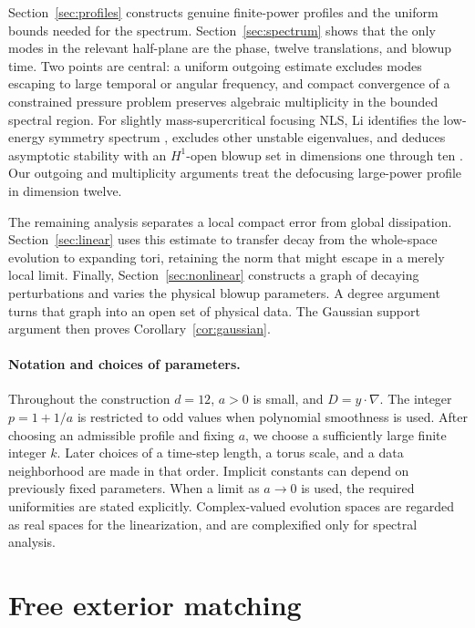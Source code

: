 \documentclass[11pt]{article}
\numberwithin{equation}{section}
\theoremstyle{definition}
\theoremstyle{remark}
\begin{document}
Section~\ref{sec:profiles} constructs genuine finite-power profiles and
the uniform bounds needed for the spectrum. Section~\ref{sec:spectrum}
shows that the only modes in the relevant half-plane are the phase,
twelve translations, and blowup time. Two points are central: a uniform
outgoing estimate excludes modes escaping to large temporal or angular
frequency, and compact convergence of a constrained pressure problem
preserves algebraic multiplicity in the bounded spectral region.
For slightly mass-supercritical focusing NLS, Li identifies the
low-energy symmetry spectrum \cite[Theorem~1.1]{Li2025Low}, excludes
other unstable eigenvalues, and deduces asymptotic stability with an
$H^1$-open blowup set in dimensions one through ten
\cite[Theorems~1.2--1.3]{Li2025High}. Our outgoing and multiplicity
arguments treat the defocusing large-power profile in dimension twelve.

The remaining analysis separates a local compact error from global
dissipation. Section~\ref{sec:linear} uses this estimate to transfer
decay from the whole-space evolution to expanding tori, retaining the
norm that might escape in a merely local limit. Finally,
Section~\ref{sec:nonlinear} constructs a graph of decaying perturbations
and varies the physical blowup parameters. A degree argument turns that
graph into an open set of physical data. The Gaussian support argument
then proves Corollary~\ref{cor:gaussian}.

\paragraph{Notation and choices of parameters.}
Throughout the construction $d=12$, $a>0$ is small, and
$D=y\cdot\nabla$. The integer $p=1+1/a$ is restricted to odd values
when polynomial smoothness is used. After choosing an admissible profile
and fixing $a$, we choose a sufficiently large finite integer $k$.
Later choices of a time-step length, a torus scale, and a data
neighborhood are made in that order. Implicit constants can depend on
previously fixed parameters. When a limit as $a\to0$ is used, the
required uniformities are stated explicitly. Complex-valued evolution
spaces are regarded as real spaces for the linearization, and are
complexified only for spectral analysis.

\section{Free exterior matching}\label{sec:free}
\end{document}
